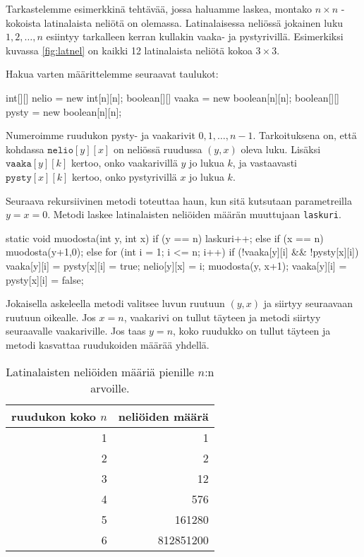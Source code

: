 Tarkastelemme esimerkkinä tehtävää, jossa haluamme laskea,
montako $n \times n$ -kokoista latinalaista neliötä on olemassa.
Latinalaisessa neliössä jokainen luku $1,2,\dots,n$ esiintyy
tarkalleen kerran kullakin vaaka- ja pystyrivillä.
Esimerkiksi kuvassa \ref{fig:latnel} on kaikki 12 latinalaista neliötä kokoa $3 \times 3$.

Hakua varten määrittelemme seuraavat taulukot:

\begin{code}
int[][] nelio = new int[n][n];
boolean[][] vaaka = new boolean[n][n];
boolean[][] pysty = new boolean[n][n];
\end{code}

Numeroimme ruudukon pysty- ja vaakarivit $0,1,\dots,n-1$.
Tarkoituksena on, että kohdassa $\texttt{nelio}[y][x]$
on neliössä ruudussa $(y,x)$ oleva luku.
Lisäksi $\texttt{vaaka}[y][k]$ kertoo, onko vaakarivillä $y$
jo lukua $k$, ja vastaavasti $\texttt{pysty}[x][k]$ kertoo,
onko pystyrivillä $x$ jo lukua $k$.

Seuraava rekursiivinen metodi toteuttaa haun, kun sitä
kutsutaan parametreilla $y=x=0$.
Metodi laskee latinalaisten neliöiden määrän muuttujaan 
\texttt{laskuri}.

\begin{code}
static void muodosta(int y, int x) {
    if (y == n) laskuri++;
    else if (x == n) muodosta(y+1,0);
    else {
        for (int i = 1; i <= n; i++) {
            if (!vaaka[y][i] && !pysty[x][i]) {
                vaaka[y][i] = pysty[x][i] = true;
                nelio[y][x] = i;
                muodosta(y, x+1);
                vaaka[y][i] = pysty[x][i] = false;
            }
        }
    }
}
\end{code}

Jokaisella askeleella metodi valitsee luvun ruutuun
$(y,x)$ ja siirtyy seuraavaan ruutuun oikealle.
Jos $x=n$, vaakarivi on tullut täyteen ja metodi siirtyy
seuraavalle vaakariville.
Jos taas $y=n$, koko ruudukko on tullut täyteen ja
metodi kasvattaa ruudukoiden määrää yhdellä.

\begin{table}
\center
\begin{tabular}{rr}
ruudukon koko $n$ & neliöiden määrä \\
\hline
1 & 1 \\
2 & 2 \\
3 & 12 \\
4 & 576 \\
5 & 161280 \\
6 & 812851200 \\
\end{tabular}
\caption{Latinalaisten neliöiden määriä pienille $n$:n arvoille.}
\label{tab:latnel}
\end{table}

